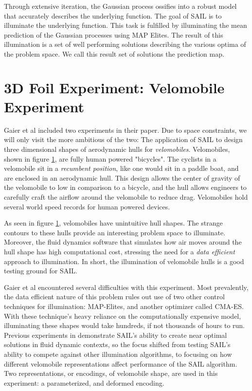 \documentclass{sig-alternate}
\begin{document}
Through extensive iteration, the Gaussian process ossifies into a robust model that accurately describes the underlying function.
The goal of SAIL is to illuminate the underlying function.
This task is fulfilled by illuminating the mean prediction of the Gaussian processes using MAP Elites.
The result of this illumination is a set of well performing solutions describing the various optima of the problem space.
We call this result set of solutions the prediction map.

\section{3D Foil Experiment: Velomobile Experiment}
\label{3DFoilExperiment}

Gaier et al included two experiments in their paper.
Due to space constraints, we will only visit the more ambitious of the two:
The application of SAIL to design three dimensional shapes of aerodynamic hulls for \textit{velomobiles}.
Velomobiles, shown in figure \ref{fig:Velomobile}, are fully human powered "bicycles".
The cyclists in a velomobile sit in a \textit{recumbent position}, like one would sit in a paddle boat, and are enclosed in an aerodynamic hull.
This design allows the center of gravity of the velomobile to low in comparison to a bicycle, and the hull allows engineers to carefully craft the airflow around the velomobile to reduce drag.
Velomobiles hold several world speed records for human powered devices.

\begin{figure}[htb]
\centering
{}
\label{fig:Velomobile}
\caption{}
\end{figure}

As seen in figure \ref{fig:Velomobile}, velomobiles have unintuitive hull shapes.
The strange contours to these hulls provide an interesting problem space to illuminate.
Moreover, the fluid dynamics software that simulates how air moves around the hull shape has high computational cost, stressing the need for a \textit{data efficient} approach to illumination.
In short, the illumination of velomobile hulls is a good testing ground for SAIL.

Gaier et al encountered several difficulties with this experiment.
Most prevalently, the data efficient nature of this problem rules out use of two other control techniques for illumination:
MAP-Elites, and another optimizer called CMA-ES.
With these technique's heavy reliance on the computationally expensive model, illuminating these shapes would take hundreds, if not thousands of hours to run.
Previous experiments in \cite{Gaier:2018} demonstrate SAIL's ability to create near optimal solutions in fluid dynamic contexts, so the focus shifted from testing SAIL's ability to compete against other illumination algorithms, to focusing on how different velomobile representations affect performance of the SAIL algorithm.
Two representations, or encodings, of velomobile shape, are used in this experiment: a parameterized, and deformed encoding.
\end{document}
